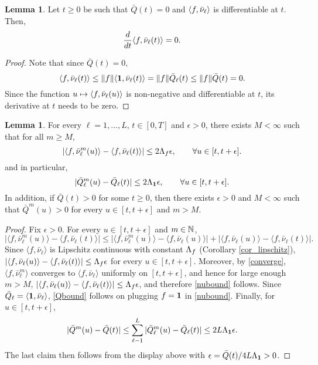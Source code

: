 \documentclass{article}
\theoremstyle{definition}
\newtheorem{lemma}[theorem]{Lemma}
\numberwithin{equation}{section}
\begin{document}
\begin{lemma}\label{lem_idle}
  Let $t\geq0$ be such that $\bar Q(t)=0$ and $\langle f,\bar{\nu}_\ell\rangle$ is differentiable at $t$. Then,
  \[
  \frac{d}{dt}\langle f,\bar{\nu}_\ell(t) \rangle =0.
  \]
\end{lemma}
\begin{proof}
  Note that since $\bar Q(t)=0,$
  \[
  \langle f,\bar\nu_\ell(t)\rangle \leq  \|f\|  \langle \f1,\bar\nu_\ell(t)\rangle = \|f\| \bar Q_\ell(t) \leq \|f\| \bar Q(t) =0.
  \]
Since the function $u\mapsto \langle f,\bar{\nu}_\ell(u) \rangle $ is non-negative and differentiable at $t$, its derivative at $t$ needs to be zero.
\end{proof}


\begin{lemma}\label{lem_nonidle}
For every $\ell=1,...,L$, $t\in[0,T]$ and $\epsilon>0$, there exists $M<\infty$ such that for all $m\geq M$,
\begin{equation}\label{nubound}
|\langle f,\bar \nu_\ell^m(u)\rangle-\langle f,\bar \nu_\ell(t)\rangle|\leq 2\Lambda_f \epsilon,\quad\quad \forall u\in[t,t+\epsilon].
\end{equation}
and in particular,
\begin{equation}\label{Qbound}
|\bar Q_\ell^m(u)-\bar Q_\ell(t)|\leq 2\Lip_{\f1} \epsilon,\quad\quad \forall u\in[t,t+\epsilon].
\end{equation}
In addition, if $\bar Q(t)>0$ for some $t\geq0$, then there exists $\epsilon>0$ and $M<\infty$ such that $\bar Q^m(u)>0$ for every $u\in[t,t+\epsilon]$ and $m>M$.
\end{lemma}
\begin{proof}
Fix $\epsilon>0$. For every $u\in[t,t+\epsilon]$ and $m\in\mathbb{N}$,
\[
|\langle f,\bar \nu_\ell^m(u)\rangle-\langle f,\bar \nu_\ell(t)\rangle| \leq
|\langle f,\bar \nu_\ell^m(u)\rangle-\langle f,\bar \nu_\ell(u)\rangle| +
|\langle f,\bar \nu_\ell(u)\rangle-\langle f,\bar \nu_\ell(t)\rangle|
.\]
Since  $\langle f,\bar \nu_\ell\rangle$ is  Lipschitz continuous with constant $\Lambda_f$ (Corollary \ref{cor_lipschitz}),  $|\langle f,\bar \nu_\ell(u)\rangle-\langle f,\bar \nu_\ell(t)\rangle|\leq \Lambda_f\epsilon$ for every  $u\in[t,t+\epsilon]$. Moreover, by \eqref{converge}, $\langle f,\bar\nu^m_\ell\rangle$ converges to $\langle f,\bar \nu_\ell\rangle$  uniformly on $[t,t+\epsilon]$, and hence for large enough $m>M$, $|\langle f,\bar \nu_\ell(u)\rangle-\langle f,\bar \nu_\ell(t)\rangle|\leq \Lambda_f\epsilon$, and therefore \eqref{nubound} follows. Since  $\bar Q_\ell=\langle \f1,\bar \nu_\ell\rangle$, \eqref{Qbound} follows on plugging $f=\f1$ in \eqref{nubound}. Finally, for $u\in[t,t+\epsilon]$,
\[|\bar Q^m(u)-\bar Q(t)|\leq \sum_{\ell-1}^L |\bar Q^m_\ell(u)-\bar Q_\ell(t)|\leq 2L\Lip_\f1\epsilon.\]
The last claim then follows from the display above with  $\epsilon=\bar Q(t)/4L\Lip_{\f1}>0$.
\end{proof}
\end{document}
